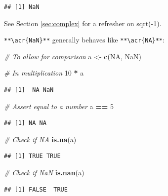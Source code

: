 \documentclass[
]{book}
\newenvironment{Shaded}{\begin{snugshade}}{\end{snugshade}}
\newcommand{\CommentTok}[1]{\textcolor[rgb]{0.56,0.35,0.01}{\textit{#1}}}
\newcommand{\ConstantTok}[1]{\textcolor[rgb]{0.56,0.35,0.01}{#1}}
\newcommand{\DecValTok}[1]{\textcolor[rgb]{0.00,0.00,0.81}{#1}}
\newcommand{\FunctionTok}[1]{\textcolor[rgb]{0.13,0.29,0.53}{\textbf{#1}}}
\newcommand{\NormalTok}[1]{#1}
\newcommand{\OtherTok}[1]{\textcolor[rgb]{0.56,0.35,0.01}{#1}}
\newcommand{\SpecialCharTok}[1]{\textcolor[rgb]{0.81,0.36,0.00}{\textbf{#1}}}
\begin{document}
\begin{verbatim}
## [1] NaN
\end{verbatim}

See Section \ref{sec:complex} for a refresher on sqrt(-1).

\texttt{**\textbackslash{}acr\{NaN\}**} generally behaves like \texttt{**\textbackslash{}acr\{NA\}**}:

\begin{Shaded}
\begin{Highlighting}[]
\CommentTok{\# To allow for comparison}
\NormalTok{a }\OtherTok{\textless{}{-}} \FunctionTok{c}\NormalTok{(}\ConstantTok{NA}\NormalTok{, }\ConstantTok{NaN}\NormalTok{)}

\CommentTok{\# In multiplication}
\DecValTok{10} \SpecialCharTok{*}\NormalTok{ a}
\end{Highlighting}
\end{Shaded}

\begin{verbatim}
## [1]  NA NaN
\end{verbatim}

\begin{Shaded}
\begin{Highlighting}[]
\CommentTok{\# Assert equal to a number }
\NormalTok{a }\SpecialCharTok{==} \DecValTok{5}
\end{Highlighting}
\end{Shaded}

\begin{verbatim}
## [1] NA NA
\end{verbatim}

\begin{Shaded}
\begin{Highlighting}[]
\CommentTok{\# Check if NA}
\FunctionTok{is.na}\NormalTok{(a)}
\end{Highlighting}
\end{Shaded}

\begin{verbatim}
## [1] TRUE TRUE
\end{verbatim}

\begin{Shaded}
\begin{Highlighting}[]
\CommentTok{\# Check if NaN}
\FunctionTok{is.nan}\NormalTok{(a)}
\end{Highlighting}
\end{Shaded}

\begin{verbatim}
## [1] FALSE  TRUE
\end{verbatim}
\end{document}
